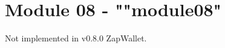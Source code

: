 \newpage
\section{Module 08 - {\ttfamily ""module08"}}
\label{sec:module08_predicate}

Not implemented in v0.8.0 ZapWallet.

